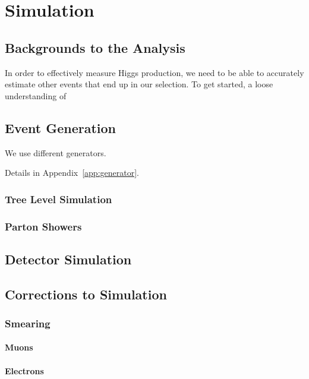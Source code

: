 \chapter{Simulation} \label{ch:simulation}

\section{Backgrounds to the Analysis}

In order to effectively measure Higgs production,
we need to be able to accurately estimate other events
that end up in our selection.
To get started, a loose understanding of 

\section{Event Generation}

We use different generators.

Details in Appendix~\ref{app:generator}.

\subsection{Tree Level Simulation}

\subsection{Parton Showers}

\section{Detector Simulation}


\section{Corrections to Simulation}

\subsection{Smearing}

\subsubsection{Muons}

\subsubsection{Electrons}

